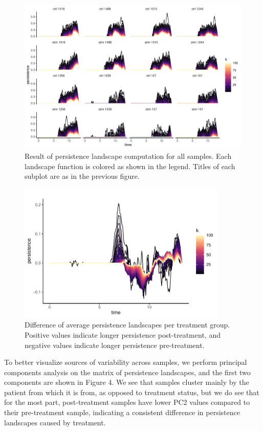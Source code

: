 \documentclass[11pt]{article}
\begin{document}
\begin{figure}[!htb]
    \centering
	\includegraphics[width=14cm]{results/all_persistence_landscapes.pdf}
    \caption{Result of persistence landscape computation for all samples. Each landscape function is colored as shown in the legend. Titles of each subplot are as in the previous figure.}
\end{figure}

\begin{figure}[!htb]
    \centering
	\includegraphics[width=10cm]{results/all_persistence_landscape_difference.pdf}
    \caption{Difference of average persistence landscapes per treatment group. Positive values indicate longer persistence post-treatment, and negative values indicate longer persistence pre-treatment.}
\end{figure}

To better visualize sources of variability across samples, we perform principal components analysis on the matrix of persistence landscapes, and the first two components are shown in Figure 4. We see that samples cluster mainly by the patient from which it is from, as opposed to treatment status, but we do see that for the most part, post-treatment samples have lower PC2 values compared to their pre-treatment sample, indicating a consistent difference in persistence landscapes caused by treatment.
\end{document}
